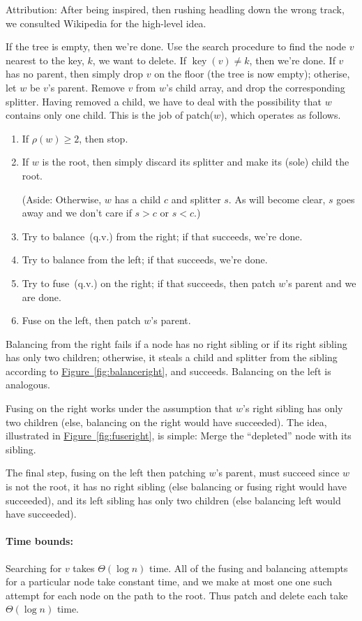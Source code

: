\documentclass[a4paper]{article}
\DeclareMathOperator{\key}{key}
\newcommand*{\figref}[1]{\hyperref[#1]{Figure~\ref*{#1}}}
\begin{document}
Attribution:
After being inspired, then rushing headling down the wrong track, we consulted Wikipedia for the high-level idea.

If the tree is empty, then we're done.
Use the search procedure to find the node $v$ nearest to the key, $k$, we want to delete.
If $\key(v) \not= k$, then we're done.
If $v$ has no parent, then simply drop $v$ on the floor (the tree is now empty); otherise, let $w$ be $v$'s parent.
Remove $v$ from $w$'s child array, and drop the corresponding splitter.
Having removed a child, we have to deal with the possibility that $w$ contains only one child.
This is the job of patch($w$), which operates as follows.
\begin{enumerate}
\item If $\rho(w) \ge 2$, then stop.
\item If $w$ is the root, then simply discard its splitter and make its (sole) child the root.

(Aside:
Otherwise, $w$ has a child $c$ and splitter $s$.
As will become clear, $s$ goes away and we don't care if $s > c$ or $s < c$.)

\item Try to balance~(q.v.) from the right; if that succeeds, we're done.
\item Try to balance from the left; if that succeeds, we're done.
\item Try to fuse~(q.v.) on the right; if that succeeds, then patch $w$'s parent and we are done.
\item Fuse on the left, then patch $w$'s parent.
\end{enumerate}
Balancing from the right fails if a node has no right sibling or if its right sibling has only two children; otherwise, it steals a child and splitter from the sibling according to \figref{fig:balanceright}, and succeeds.
Balancing on the left is analogous.

Fusing on the right works under the assumption that $w$'s right sibling has only two children (else, balancing on the right would have succeeded).
The idea, illustrated in \figref{fig:fuseright}, is simple:
Merge the ``depleted'' node with its sibling.

The final step, fusing on the left then patching $w$'s parent, must succeed since $w$ is not the root, it has no right sibling (else balancing or fusing right would have succeeded), and its left sibling has only two children (else balancing left would have succeeded).

\paragraph{Time bounds:}
Searching for $v$ takes $\Theta(\log n)$ time.
All of the fusing and balancing attempts for a particular node take constant time, and we make at most one one such attempt for each node on the path to the root.
Thus patch and delete each take $\Theta(\log n)$ time.
\end{document}
